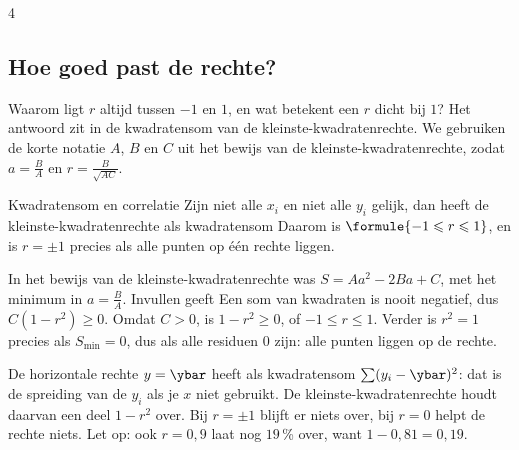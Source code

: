 \begin{alleenvoor}{4}
\begin{oefeningen}
\end{oefeningen}

\subsection{Hoe goed past de rechte?}

Waarom ligt $r$ altijd tussen $-1$ en $1$, en wat betekent een $r$ dicht bij $1$? Het antwoord zit in de kwadratensom van de kleinste-kwadratenrechte. We gebruiken de korte notatie $A$, $B$ en $C$ uit het bewijs van de kleinste-kwadratenrechte, zodat $a = \frac{B}{A}$ en $r = \frac{B}{\sqrt{AC}}$.

\begin{theorie}
\begin{stelling}{Kwadratensom en correlatie}
Zijn niet alle $x_i$ en niet alle $y_i$ gelijk, dan heeft de kleinste-kwadratenrechte als kwadratensom
Daarom is $\formule{-1 \leqslant r \leqslant 1}$, en is $r = \pm 1$ precies als alle punten op één rechte liggen.
\end{stelling}

\begin{bewijs}
In het bewijs van de kleinste-kwadratenrechte was $S = Aa^2 - 2Ba + C$, met het minimum in $a = \frac{B}{A}$. Invullen geeft
Een som van kwadraten is nooit negatief, dus $C(1 - r^2) \geqslant 0$. Omdat $C > 0$, is $1 - r^2 \geqslant 0$, of $-1 \leqslant r \leqslant 1$. Verder is $r^2 = 1$ precies als $S_{\min} = 0$, dus als alle residuen $0$ zijn: alle punten liggen op de rechte.
\end{bewijs}
\end{theorie}

De horizontale rechte $y = \ybar$ heeft als kwadratensom $\sum (y_i - \ybar)^2$: dat is de spreiding van de $y_i$ als je $x$ niet gebruikt. De kleinste-kwadratenrechte houdt daarvan een deel $1 - r^2$ over. Bij $r = \pm 1$ blijft er niets over, bij $r = 0$ helpt de rechte niets. Let op: ook $r = 0{,}9$ laat nog $19$\,\% over, want $1 - 0{,}81 = 0{,}19$.


\end{alleenvoor}
